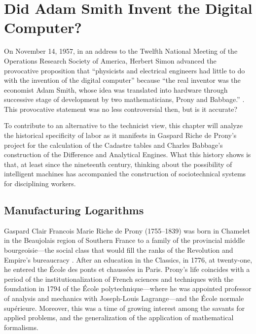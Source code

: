 \documentclass[version=last,draft=false,paper=A4,portrait,twoside=true,twocolumn=false,headinclude=false,footinclude=false,mpinclude=true,fontsize=12,BCOR=20mm,DIV=calc,pagesize=auto,open=right,chapterprefix=true,numbers=autoendperiod,headsepline=false,headings=twolinechapter,parskip=false]{scrbook}
\begin{document}
\chapter{Did Adam Smith Invent the Digital Computer?}
\label{sec:orgab03527}

On November 14, 1957, in an address to the Twelfth National Meeting of the
Operations Research Society of America, Herbert Simon advanced the
provocative proposition that ``physicists and electrical engineers had
little to do with the invention of the digital computer'' because ``the
real inventor was the economist Adam Smith, whose idea was translated into
hardware through successive stage of development by two mathematicians,
Prony and Babbage.'' \autocite[2]{simon_newell1958}. This provocative
statement was no less controversial then, but is it accurate?

To contribute to an alternative to the technicist view, this chapter will
analyze the historical specificity of labor as it manifests in Gaspard
Riche de Prony's project for the calculation of the Cadastre tables and
Charles Babbage's construction of the Difference and Analytical Engines.
What this history shows is that, at least since the nineteenth century,
thinking about the possibility of intelligent machines has accompanied the
construction of sociotechnical systems for disciplining workers. 

\section{Manufacturing Logarithms}
\label{sec:org51d138b}
Gaspard Clair Francois Marie Riche de Prony (1755--1839) was born in
Chamelet in the Beaujolais region of Southern France to a family of the
provincial middle bourgeoisie---the social class that would fill the ranks
of the Revolution and Empire's bureaucracy \autocite{picon_et_al1984}. After
an education in the Classics, in 1776, at twenty-one, he entered the École
des ponts et chaussées in Paris. Prony's life coincides with a period of
the institutionalization of French sciences and techniques with the
foundation in 1794 of the École polytechnique---where he was appointed
professor of analysis and mechanics with Joseph-Louis Lagrange---and the
École normale supérieure. Moreover, this was a time of growing interest
among the savants for applied problems, and the generalization of the
application of mathematical formalisms.
\end{document}
